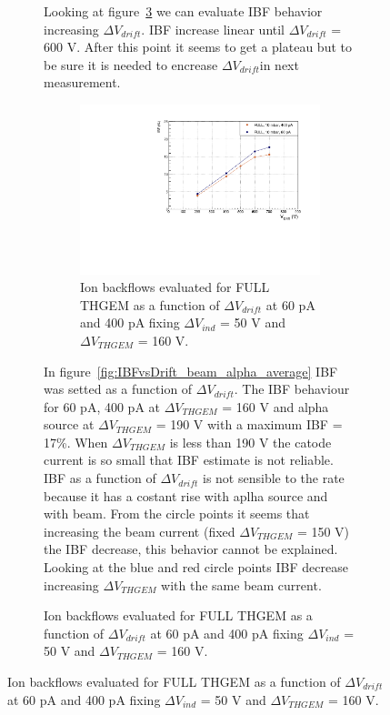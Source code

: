 \documentclass[a4paper, 11 pt]{article}
\newcommand{\Vind}{$\Delta V_{ind}$}
\newcommand{\Vthgem}{$\Delta V_{THGEM}$}
\newcommand{\Vdrift}{$ \Delta V_{drift}$}
\begin{document}
\begin{figure}[htbp]
\begin{figure}[htbp]
Looking at figure~\ref{fig:IBFvsDrift_withBeam} we can evaluate IBF behavior increasing \Vdrift{}. IBF increase linear until \Vdrift{} = 600 V. After this point it seems to get a plateau but to be sure it is needed to encrease \Vdrift{}in next measurement.\\

\begin{figure}[htbp]
	\centering
	\includegraphics[width=\textwidth]{Immagini/IBFvsDrift_withBeam.pdf}
	\caption{Ion backflows evaluated for FULL THGEM as a function of \Vdrift{} at 60 pA and 400 pA fixing \Vind{} = 50 V and \Vthgem{} = 160 V.}
	\label{fig:IBFvsDrift_withBeam}
\end{figure}



In figure~\ref{fig:IBFvsDrift_beam_alpha_average} IBF was setted as a function of \Vdrift{}. The IBF behaviour for 60 pA, 400 pA at \Vthgem{} = 160 V and alpha source at \Vthgem{} = 190 V with a maximum IBF = 17\%. When \Vthgem{} is less than 190 V the catode current is so small that IBF estimate is not reliable. IBF as a function of \Vdrift{} is not sensible to the rate because it has a costant rise with aplha source and with beam. From the circle points it seems that increasing the beam current (fixed \Vthgem{} = 150 V) the IBF decrease, this behavior cannot be explained. Looking at the blue and red circle points IBF decrease increasing \Vthgem{} with the same beam current.\\


\end{figure}
\end{figure}
\end{document}

